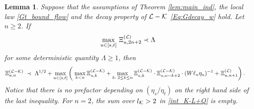 \documentclass[10pt,reqno]{article}
\theoremstyle{plain} %
\newtheorem{lemma}[theorem]{Lemma}
\theoremstyle{remark}
\numberwithin{equation}{section}
\begin{document}
\begin{lemma}\label{lem:STOeq_Qt} 
Suppose that  the assumptions of 
 Theorem \ref{lem:main_ind},  the local law \eqref{Gt_bound_flow} and the decay property of $\cal L-\cal K$ \eqref{Eq:Gdecay_w} hold. 
Let $n\ge 2$. If 
 $$
 \max_{u\in [s,t]}\, \Xi^{(\cal L)}_{u, {2n+2}}\prec {  \Lambda}
 $$
 for some deterministic quantity $ \Lambda \ge 1$, 
then 
\begin{align}\label{am;asoi222}
 \Xi^{({\cal L-\cal K})}_{u,n}
 \;\prec\;  &\; { \Lambda}^{1/2}+\max_{u\in [s,t]}
  \left(\; \max_{k<n }\Xi^{({\cal L-\cal K})}_{u,k}+\max_{k:\;2\le k\le n }\Xi^{({\cal L-\cal K})}_{u,k}\cdot \Xi^{({\cal L-\cal K})}_{u,n-k+2}\cdot(W\ell_u\eta_u)^{-1}+\Xi^{({\cal L})}_{u,n+1}\right).
\end{align}
Notice that  there is no prefactor depending on  $(\eta_s/\eta_t)$ on the right hand side of the last inequality. For $n=2$, the sum over $l_{\cal K}>2$ in \eqref{int_K-L+Q} is empty.
\end{lemma}
\end{document}
